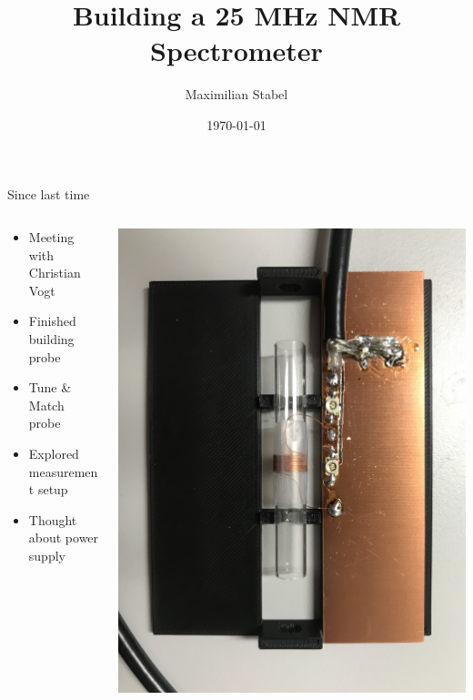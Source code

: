 \documentclass{ethpresentation}
\title{Building a 25 MHz NMR Spectrometer}
\date{\today}
\author{Maximilian Stabel}
\institute{ETH Zürich}
\begin{document}
  \maketitle
  \begin{frame}{Since last time}
    \begin{columns}
      \begin{column}{0.45\textwidth}
        \begin{itemize}
          \item Meeting with Christian Vogt
          \item Finished building probe
          \item Tune \& Match probe
          \item Explored measurement setup
          \item Thought about power supply
        \end{itemize}
      \end{column}
      \begin{column}{0.45\textwidth}
        \includegraphics[width=\textwidth]{./img/230418-finished_probe_only.JPG}
      \end{column}
    \end{columns}
  \end{frame}
\end{document}
